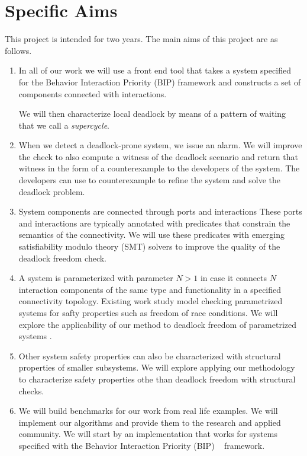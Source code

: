 \section{Specific Aims}

This project is intended for two years.
The main aims of this project are as follows.

\begin{enumerate}

\item 
In all of our work we will use a front end tool that
takes a system specified for the Behavior Interaction Priority (BIP)
framework and constructs a set of components connected 
with interactions. 



 We will then characterize local deadlock by
means of a pattern of waiting that we call a \emph{supercycle}.


\item 
When we detect a deadlock-prone system, we issue an alarm. 
We will improve the check to also compute a witness of the deadlock scenario 
and return that witness in the form of a counterexample 
to the developers of the system. 
The developers can use to counterexample to refine the system and solve
the deadlock problem. 

\item 
System components are connected through ports and interactions
These ports and interactions are typically annotated with predicates
that constrain the semantics of the connectivity. 
We will use these predicates with emerging satisfiability modulo theory (SMT) 
solvers to improve the quality of the deadlock freedom check.

		
\item 
A system is parameterized with parameter $N>1$ 
in case it connects $N$ interaction components of the 
same type and functionality in a specified connectivity topology. 
Existing work study model checking parametrized systems for safty properties
such as freedom of race conditions. 
We will explore the applicability of our method to deadlock freedom 
of parametrized systems
		. 

\item
Other system safety properties can also be characterized with structural 
properties of smaller subsystems. 
We will explore applying our methodology to characterize safety properties 
othe than deadlock freedom with structural checks. 

\item 
We will build benchmarks for our work from real life examples.
We will implement our algorithms and provide them to the research and 
applied community. 
We will start by an implementation that works for systems specified with 
the Behavior Interaction Priority (BIP) ~\cite{bip06} framework.

\end{enumerate}


